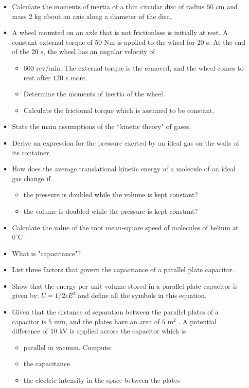 \documentclass{article}
\begin{document}
\begin{itemize}
\item Calculate the moments of inertia of a thin circular disc of radius $ 50$ cm and mass $ 2$ kg about an axis along a diameter of the disc.
\item A wheel mounted on an axle that is not frictionless is initially at rest. A constant external torque of $ 50$ Nm is applied to the wheel for $ 20$ s. At the end of the $ 20$ s, the wheel has an angular velocity of
 \begin{itemize}
\item $ 600$ rev/min. The external torque is the removed, and the wheel comes to rest after $ 120$ s more.
\item Determine the moments of inertia of the wheel.
\item Calculate the frictional torque which is assumed to be constant. 
\end{itemize}
\item State the main assumptions of the “kinetic theory" of gases.
\item Derive an expression for the pressure exerted by an ideal gas on the walls of its container.
\item How does the average translational kinetic energy of a molecule of an ideal gas change if
 \begin{itemize}
\item the pressure is doubled while the volume is kept constant?
\item the volume is doubled while the pressure is kept constant?
\end{itemize}
\item Calculate the value of the root mean-square speed of molecules of helium at $ 0^{\circ}$C .
\item What is "capacitance"?
\item List three factors that govern the capacitance of a parallel plate capacitor.
\item Show that the energy per unit volume stored in a parallel plate capacitor is given by: $ U=1/2\epsilon E^{2}$ and define all the symbols in this equation.
\item Given that the distance of separation between the parallel plates of a capacitor is $ 5$ mm, and the plates have an area of $ 5$ m$ ^{2}$ . A potential difference of $ 10$ kV is applied across the capacitor which is
 \begin{itemize}
\item parallel in vacuum. Compute:
\item the capacitance
\item the electric intensity in the space between the plates

\end{itemize}
\end{itemize}
\end{document}
